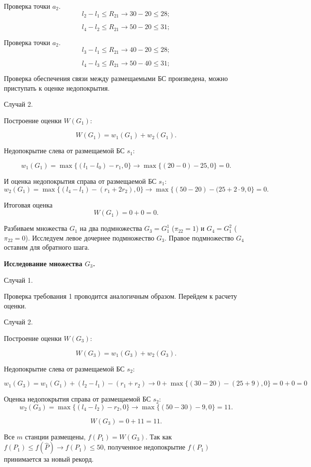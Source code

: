 Проверка точки $a_2$.
$$
l_2 - l_1 \leqslant R_{21} \rightarrow 30 - 20 \leqslant  28;
$$

$$
l_4 - l_2 \leqslant R_{21} \rightarrow 50 - 20 \leqslant  31;
$$

Проверка точки $a_2$.
$$
l_3 - l_1 \leqslant R_{21} \rightarrow 40 - 20 \leqslant  28;
$$

$$
l_4 - l_3 \leqslant R_{21} \rightarrow 50 - 40 \leqslant  31;
$$

Проверка обеспечения связи между размещаемыми БС произведена, можно приступать к оценке недопокрытия.

Случай 2.

Построение оценки $W(G_1)$:

$$
W(G_1) = w_1(G_1) + w_2(G_1).
$$

Недопокрытие слева от размещаемой БС $s_1$:

$$
w_1(G_1) = \max\{(l_1 - l_0) - r_1, 0\} \rightarrow \max\{(20 - 0) - 25, 0\} = 0.
$$

И оценка недопокрытия справа от размещаемой БС $s_1$: 
$$
w_2(G_1) = \max\{(l_4 - l_1) - (r_1 + 2r_2), 0\} \rightarrow \max\{(50 - 20) - (25 + 2 \cdot 9, 0\} = 0.
$$

Итоговая оценка
$$
W(G_1) = 0 + 0 = 0.
$$

Разбиваем множества $G_1$ на два подмножества $G_3 = G^1_1$ ($\pi_{22} = 1$) и $G_4 = G^2_1$ ($\pi_{22} = 0$). Исследуем  левое дочернее подмножество $G_3$. Правое подмножество $G_4$ оставим для обратного шага.

\textbf{Исследование множества $G_3$.}

Случай 1.

Проверка требования 1 проводится аналогичным образом. Перейдем к расчету оценки.

Случай 2.

Построение оценки $W(G_3)$:

$$
W(G_3) = w_1(G_3) + w_2(G_3).
$$

Недопокрытие слева от размещаемой БС $s_2$:

$$
w_1(G_3) =  w_1(G_1) + (l_2 - l_1) - (r_1 + r_2) \rightarrow 0 + \max\{(30 - 20) - (25+ 9), 0\} = 0 + 0 = 0
$$

Оценка недопокрытия справа от размещаемой БС $s_2$: 
$$
w_2(G_3) = \max\{(l_4 - l_2) - r_2, 0\} \rightarrow \max\{(50 - 30) - 9, 0\} = 11.
$$

$$
W(G_3) = 0 + 11 = 11.
$$

Все $m$ станции размещены, $f(P_1) = W(G_3)$. Так как $f(P_1) \leqslant f(\widehat{P}) \rightarrow f(P_1) \leqslant 50$, полученное недопокрытие $f(P_1)$ принимается за новый рекорд.


